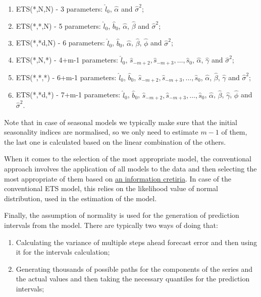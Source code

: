 \documentclass[
]{book}
\providecommand{\tightlist}{%
  \setlength{\itemsep}{0pt}\setlength{\parskip}{0pt}}
\theoremstyle{definition}
\theoremstyle{definition}
\theoremstyle{definition}
\theoremstyle{definition}
\theoremstyle{remark}
\begin{document}
\begin{enumerate}
\def\labelenumi{\arabic{enumi}.}
\tightlist
\item
  ETS(*,N,N) - 3 parameters: \(\hat{l}_0\), \(\hat{\alpha}\) and \(\hat{\sigma}^2\);
\item
  ETS(*,*,N) - 5 parameters: \(\hat{l}_0\), \(\hat{b}_0\), \(\hat{\alpha}\), \(\hat{\beta}\) and \(\hat{\sigma}^2\);
\item
  ETS(*,*d,N) - 6 parameters: \(\hat{l}_0\), \(\hat{b}_0\), \(\hat{\alpha}\), \(\hat{\beta}\), \(\hat{\phi}\) and \(\hat{\sigma}^2\);
\item
  ETS(*,N,*) - 4+m-1 parameters: \(\hat{l}_0\), \(\hat{s}_{-m+2}, \hat{s}_{-m+3}, \dots, \hat{s}_{0}\), \(\hat{\alpha}\), \(\hat{\gamma}\) and \(\hat{\sigma}^2\);
\item
  ETS(*,*,*) - 6+m-1 parameters: \(\hat{l}_0\), \(\hat{b}_0\), \(\hat{s}_{-m+2}, \hat{s}_{-m+3}, \dots, \hat{s}_{0}\), \(\hat{\alpha}\), \(\hat{\beta}\), \(\hat{\gamma}\) and \(\hat{\sigma}^2\);
\item
  ETS(*,*d,*) - 7+m-1 parameters: \(\hat{l}_0\), \(\hat{b}_0\), \(\hat{s}_{-m+2}, \hat{s}_{-m+3}, \dots, \hat{s}_{0}\), \(\hat{\alpha}\), \(\hat{\beta}\), \(\hat{\gamma}\), \(\hat{\phi}\) and \(\hat{\sigma}^2\).
\end{enumerate}

Note that in case of seasonal models we typically make sure that the initial seasonality indices are normalised, so we only need to estimate \(m-1\) of them, the last one is calculated based on the linear combination of the others.

When it comes to the selection of the most appropriate model, the conventional approach involves the application of all models to the data and then selecting the most appropriate of them based on \protect\hyperlink{modelSelection}{an information cretiria}. In case of the conventional ETS model, this relies on the likelihood value of normal distribution, used in the estimation of the model.

Finally, the assumption of normality is used for the generation of prediction intervals from the model. There are typically two ways of doing that:

\begin{enumerate}
\def\labelenumi{\arabic{enumi}.}
\tightlist
\item
  Calculating the variance of multiple steps ahead forecast error and then using it for the intervals calculation;
\item
  Generating thousands of possible paths for the components of the series and the actual values and then taking the necessary quantiles for the prediction intervals;
\end{enumerate}
\end{document}
